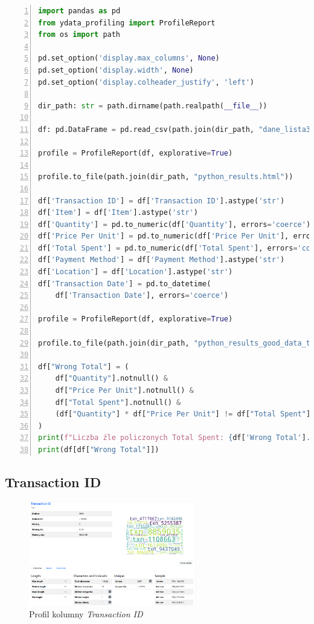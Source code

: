 \documentclass[a4paper,12pt]{article}
\begin{document}
\begin{lstlisting}[language=Python, basicstyle=\ttfamily\small, numbers=left, numberstyle=\tiny, commentstyle=\color{green}]
import pandas as pd
from ydata_profiling import ProfileReport
from os import path

pd.set_option('display.max_columns', None)
pd.set_option('display.width', None)
pd.set_option('display.colheader_justify', 'left')

dir_path: str = path.dirname(path.realpath(__file__))

df: pd.DataFrame = pd.read_csv(path.join(dir_path, "dane_lista3.csv"))

profile = ProfileReport(df, explorative=True)

profile.to_file(path.join(dir_path, "python_results.html"))

df['Transaction ID'] = df['Transaction ID'].astype('str')
df['Item'] = df['Item'].astype('str')
df['Quantity'] = pd.to_numeric(df['Quantity'], errors='coerce')
df['Price Per Unit'] = pd.to_numeric(df['Price Per Unit'], errors='coerce')
df['Total Spent'] = pd.to_numeric(df['Total Spent'], errors='coerce')
df['Payment Method'] = df['Payment Method'].astype('str')
df['Location'] = df['Location'].astype('str')
df['Transaction Date'] = pd.to_datetime(
    df['Transaction Date'], errors='coerce')

profile = ProfileReport(df, explorative=True)

profile.to_file(path.join(dir_path, "python_results_good_data_types.html"))

df["Wrong Total"] = (
    df["Quantity"].notnull() &
    df["Price Per Unit"].notnull() &
    df["Total Spent"].notnull() &
    (df["Quantity"] * df["Price Per Unit"] != df["Total Spent"])
)
print(f"Liczba źle policzonych Total Spent: {df['Wrong Total'].sum()}")
print(df[df["Wrong Total"]])  
\end{lstlisting}

\subsection{Transaction ID}

\begin{figure}[H]
  \centering
  \includegraphics[width=0.65\textwidth]{images/py_1.png}
  \caption{Profil kolumny \textit{Transaction ID}}
\end{figure}
\end{document}
